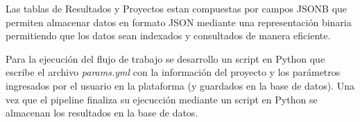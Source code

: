 Las tablas de Resultados y Proyectos estan compuestas por campos JSONB que permiten almacenar datos en formato JSON mediante una representación binaria permitiendo que los datos sean indexados y consultados de manera eficiente. 

Para la ejecución del flujo de trabajo se desarrollo un script en Python que escribe el archivo \textit{params.yml} con la información del proyecto y los parámetros ingresados por el usuario en la plataforma (y guardados en la base de datos).
Una vez que el pipeline finaliza su ejecucción mediante un script en Python se almacenan los resultados en la base de datos.


